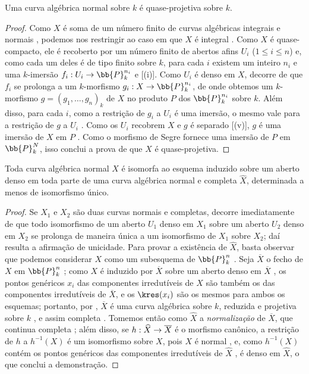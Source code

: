 \documentclass[oneside,10pt]{amsart}
\makeatletter
\renewcommand{\leq}{\leqslant}
\newcommand{\ega@arrow}[2]{\mathchoice{#1}{#2}{#2}{#2}}
\renewcommand{\to}{\ega@arrow{\longrightarrow}{\rightarrow}}
\let\EGAOriginalLabel\label
\renewcommand{\label}[1]{\phantomsection\EGAOriginalLabel{#1}}
\makeatother
\begin{document}
\begin{corollary}[7.4.10]
\label{II.7.4.10}
Uma curva algébrica normal sobre $k$ é quase-projetiva sobre $k$.
\end{corollary}

\begin{proof}
Como $X$ é soma de um número finito de curvas algébricas integrais e normais , podemos nos restringir ao caso em que $X$ é integral .
Como $X$ é quase-compacto, ele é recoberto por um número finito de abertos afins $U_i$ ($1\leq i\leq n$) e, como cada um deles é de tipo finito sobre $k$, para cada $i$ existem um inteiro $n_i$ e uma $k$-imersão $f_i:U_i\to\bb{P}_k^{n_i}$  e [(i)].
Como $U_i$ é denso em $X$, decorre de  que $f_i$ se prolonga a um $k$-morfismo $g_i:X\to\bb{P}_k^{n_i}$, de onde obtemos um $k$-morfismo $g=(g_1,\ldots,g_n)_k$ de $X$ no produto $P$ dos $\bb{P}_k^{n_i}$ sobre $k$.
Além disso, para cada $i$, como a restrição de $g_i$ a $U_i$ é uma imersão, o mesmo vale para a restrição de $g$ a $U_i$ .
Como os $U_i$ recobrem $X$ e $g$ é separado [(v)], $g$ é uma imersão de $X$ em $P$ .
Como o morfismo de Segre  fornece uma imersão de $P$ em $\bb{P}_k^N$, isso conclui a prova de que $X$ é quase-projetiva.
\end{proof}

\begin{corollary}[7.4.11]
\label{II.7.4.11}
Toda curva algébrica normal $X$ é isomorfa ao esquema induzido sobre um aberto denso em toda parte de uma curva algébrica normal e completa $\widehat{X}$, determinada a menos de isomorfismo único.
\end{corollary}

\begin{proof}
Se $X_1$ e $X_2$ são duas curvas normais e completas, decorre imediatamente de  que todo isomorfismo de um aberto $U_1$ denso em $X_1$ sobre um aberto $U_2$ denso em $X_2$ se prolonga de maneira única a um isomorfismo de $X_1$ sobre $X_2$;
daí resulta a afirmação de unicidade.
Para provar a existência de $\widehat{X}$, basta observar que podemos considerar $X$ como um subesquema de $\bb{P}_k^n$ .
Seja $\overline{X}$ o fecho de $X$ em $\bb{P}_k^n$ ;
como $X$ é induzido por $\overline{X}$ sobre um aberto denso em $\overline{X}$ , os pontos genéricos $x_i$ das componentes irredutíveis de $X$ são também os das componentes irredutíveis de $\overline{X}$, e os $\kres(x_i)$ são os mesmos para ambos os esquemas; portanto, por , $\overline{X}$ é uma curva algébrica sobre $k$, reduzida  e projetiva sobre $k$ , e assim completa .
Tomemos então como $\widehat{X}$ a \emph{normalização} de $\overline{X}$, que continua completa ;
além disso, se $h:\widehat{X}\to\overline{X}$ é o morfismo canônico, a restrição de $h$ a $h^{-1}(X)$ é um isomorfismo sobre $X$, pois $X$ é normal , e, como $h^{-1}(X)$ contém os pontos genéricos das componentes irredutíveis de $\widehat{X}$ , é denso em $\widehat{X}$, o que conclui a demonstração.
\end{proof}
\end{document}
